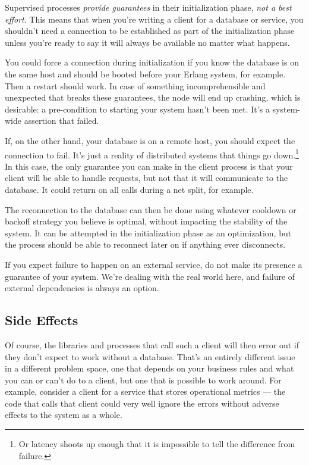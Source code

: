 Supervised processes \emph{provide guarantees} in their initialization phase, \emph{not a best effort}. This means that when you're writing a client for a database or service, you shouldn't need a connection to be established as part of the initialization phase unless you're ready to say it will always be available no matter what happens.

You could force a connection during initialization if you know the database is on the same host and should be booted before your Erlang system, for example. Then a restart should work. In case of something incomprehensible and unexpected that breaks these guarantees, the node will end up crashing, which is desirable: a pre-condition to starting your system hasn't been met. It's a system-wide assertion that failed.

If, on the other hand, your database is on a remote host, you should expect the connection to fail. It's just a reality of distributed systems that things go down.\footnote{Or latency shoots up enough that it is impossible to tell the difference from failure.} In this case, the only guarantee you can make in the client process is that your client will be able to handle requests, but not that it will communicate to the database. It could return  on all calls during a net split, for example.

The reconnection to the database can then be done using whatever cooldown or backoff strategy you believe is optimal, without impacting the stability of the system. It can be attempted in the initialization phase as an optimization, but the process should be able to reconnect later on if anything ever disconnects.

If you expect failure to happen on an external service, do not make its presence a guarantee of your system. We're dealing with the real world here, and failure of external dependencies is always an option. 

\subsection{Side Effects}
\label{subsec:start-link-side-effects}

Of course, the libraries and processes that call such a client will then error out if they don't expect to work without a database. That's an entirely different issue in a different problem space, one that depends on your business rules and what you can or can't do to a client, but one that is possible to work around. For example, consider a client for a service that stores operational metrics — the code that calls that client could very well ignore the errors without adverse effects to the system as a whole. 


